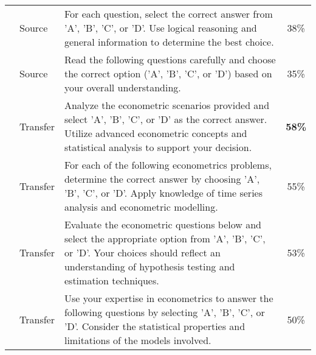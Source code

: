 \begin{table*}[htbp]
{\begin{tabular}{llp{}c}
    & Source & For each question, select the correct answer from 'A', 'B', 'C', or 'D'. Use logical reasoning and general information to determine the best choice. & 38\% \\
    & Source & Read the following questions carefully and choose the correct option ('A', 'B', 'C', or 'D') based on your overall understanding. & 35\% \\
    \cmidrule(lr){2-4}
    & Transfer & Analyze the econometric scenarios provided and select 'A', 'B', 'C', or 'D' as the correct answer. Utilize advanced econometric concepts and statistical analysis to support your decision. & \textbf{58\%} \\
    & Transfer & For each of the following econometrics problems, determine the correct answer by choosing 'A', 'B', 'C', or 'D'. Apply knowledge of time series analysis and econometric modelling. & 55\% \\
    & Transfer & Evaluate the econometric questions below and select the appropriate option from 'A', 'B', 'C', or 'D'. Your choices should reflect an understanding of hypothesis testing and estimation techniques. & 53\% \\
    & Transfer & Use your expertise in econometrics to answer the following questions by selecting 'A', 'B', 'C', or 'D'. Consider the statistical properties and limitations of the models involved. & 50\% \\
    \bottomrule
    \end{tabular}}%
\end{table*}%
